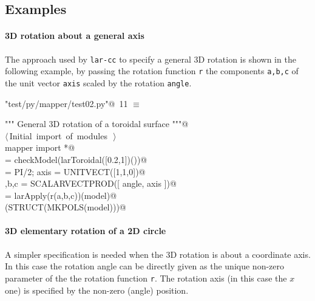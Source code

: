 \documentclass[11pt,oneside]{article}	%
\begin{document}
\subsection{Examples}

\paragraph{3D rotation about a general axis}
The approach used by \texttt{lar-cc} to specify a general 3D rotation is shown in the following example,
by passing the rotation function \texttt{r} the components \texttt{a,b,c} of the unit vector \texttt{axis} scaled by the rotation \texttt{angle}. 

\begin{flushleft} \small \label{scrap23}
\protect{}\verb@"test/py/mapper/test02.py"@\nobreak\ {\footnotesize 11 }$\equiv$
\vspace{-1ex}
\begin{list}{}{} \item
\mbox{}\verb@""" General 3D rotation of a toroidal surface """@\\
\mbox{}\verb@@\hbox{$\langle\,$Initial import of modules\nobreak\ {\footnotesize {}}$\,\rangle$}\verb@@\\
\mbox{}\verb@from mapper import *@\\
\mbox{}\verb@model = checkModel(larToroidal([0.2,1])())@\\
\mbox{}\verb@angle = PI/2; axis = UNITVECT([1,1,0])@\\
\mbox{}\verb@a,b,c = SCALARVECTPROD([ angle, axis ])@\\
\mbox{}\verb@model = larApply(r(a,b,c))(model)@\\
\mbox{}\verb@VIEW(STRUCT(MKPOLS(model)))@\\
\mbox{}\verb@@{\NWsep}
\end{list}
\vspace{-2ex}
\end{flushleft}


\paragraph{3D elementary rotation of a 2D circle}
A simpler specification is needed when the 3D rotation is about a coordinate axis. In this case the rotation angle can be directly given as the unique non-zero parameter of the the rotation function \texttt{r}. The rotation axis (in this case the $x$ one) is specified by the non-zero (angle) position.
\end{document}
